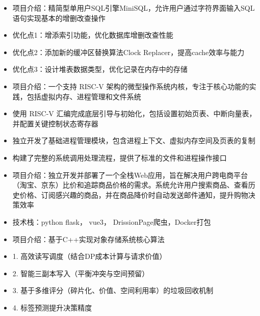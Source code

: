 \begin{itemize}
  \item 项目介绍：精简型单用户SQL引擎MiniSQL，允许用户通过字符界面输入SQL语句实现基本的增删改查操作
  \item 优化点1：增添索引功能，优化数据库增删改查性能
  \item 优化点2：添加新的缓冲区替换算法Clock Replacer，提高cache效率与能力
  \item 优化点3：设计堆表数据类型，优化记录在内存中的存储
\end{itemize}
\begin{itemize}
  \item 项目介绍：一个支持 RISC-V 架构的微型操作系统内核，专注于核心功能的实践，包括虚拟内存、进程管理和文件系统
  \item 使用 RISC-V 汇编完成底层引导与初始化，包括设置初始页表、中断向量表，并配置关键控制状态寄存器
  \item 独立开发了基础进程管理模块，包含进程上下文、虚拟内存空间及页表的复制
  \item 构建了完整的系统调用处理流程，提供了标准的文件和进程操作接口
\end{itemize}
\begin{itemize}
  \item 项目介绍：独立开发并部署了一个全栈Web应用，旨在解决用户跨电商平台（淘宝、京东）比价和追踪商品价格的需求。系统允许用户搜索商品、查看历史价格、订阅感兴趣的商品，并在商品降价时自动发送邮件通知，提升购物决策效率
  \item 技术栈：python flask， vue3， DrissionPage爬虫，Docker打包
\end{itemize}
\begin{itemize}
    \item 项目介绍：基于C++实现对象存储系统核心算法
    \item 1. 高效读写调度（结合DP成本计算与请求价值）
    \item 2. 智能三副本写入（平衡冲突与空间预留）
    \item 3. 基于多维评分（碎片化、价值、空间利用率）的垃圾回收机制
    \item 4. 标签预测提升决策精度
\end{itemize}


